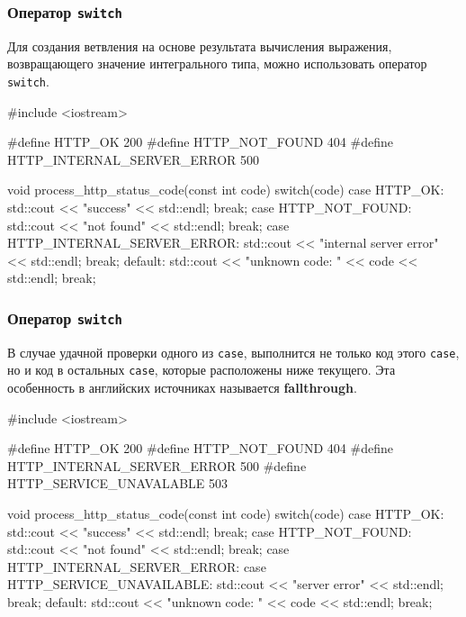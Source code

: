 \documentclass[compress, 8pt]{beamer}
\begin{document}
\begin{frame}[fragile]

    \frametitle{Оператор \texttt{switch}}

    \hfill \break

    Для создания ветвления на основе результата вычисления выражения,
    возвращающего значение интегрального типа, можно использовать
    оператор \verb|switch|.

    \begin{myinplacelisting}[%
        minted language=cpp,
        minted options={
            fontsize=\footnotesize,
            breaklines,
            breakanywhere,
            linenos,
            escapeinside=||,
            numbersep=2pt
        },
    ]
#include <iostream>

#define HTTP_OK 200
#define HTTP_NOT_FOUND 404
#define HTTP_INTERNAL_SERVER_ERROR 500

void process_http_status_code(const int code) {
    switch(code) {
        case HTTP_OK:
            std::cout << "success" << std::endl;
            break;
        case HTTP_NOT_FOUND:
            std::cout << "not found" << std::endl;
            break;
        case HTTP_INTERNAL_SERVER_ERROR:
            std::cout << "internal server error" << std::endl;
            break;
        default:
            std::cout << "unknown code: " << code << std::endl;
            break;
    }
}
    \end{myinplacelisting}

\end{frame}

\begin{frame}[fragile]

    \frametitle{Оператор \texttt{switch}}

    \hfill \break

    В случае удачной проверки одного из \verb|case|, выполнится не только
    код этого \verb|case|, но и код в остальных \verb|case|, которые
    расположены ниже текущего.
    Эта особенность в английских источниках называется \textbf{fallthrough}.

    \begin{myinplacelisting}[%
        minted language=cpp,
        minted options={
            fontsize=\footnotesize,
            breaklines,
            breakanywhere,
            linenos,
            escapeinside=||,
            numbersep=2pt
        },
    ]
#include <iostream>

#define HTTP_OK 200
#define HTTP_NOT_FOUND 404
#define HTTP_INTERNAL_SERVER_ERROR 500
#define HTTP_SERVICE_UNAVALABLE 503

void process_http_status_code(const int code) {
    switch(code) {
        case HTTP_OK:
            std::cout << "success" << std::endl;
            break;
        case HTTP_NOT_FOUND:
            std::cout << "not found" << std::endl;
            break;
        case HTTP_INTERNAL_SERVER_ERROR:
        case HTTP_SERVICE_UNAVAILABLE:
            std::cout << "server error" << std::endl;
            break;
        default:
            std::cout << "unknown code: " << code << std::endl;
            break;
    }
}
    \end{myinplacelisting}

\end{frame}
\end{document}
